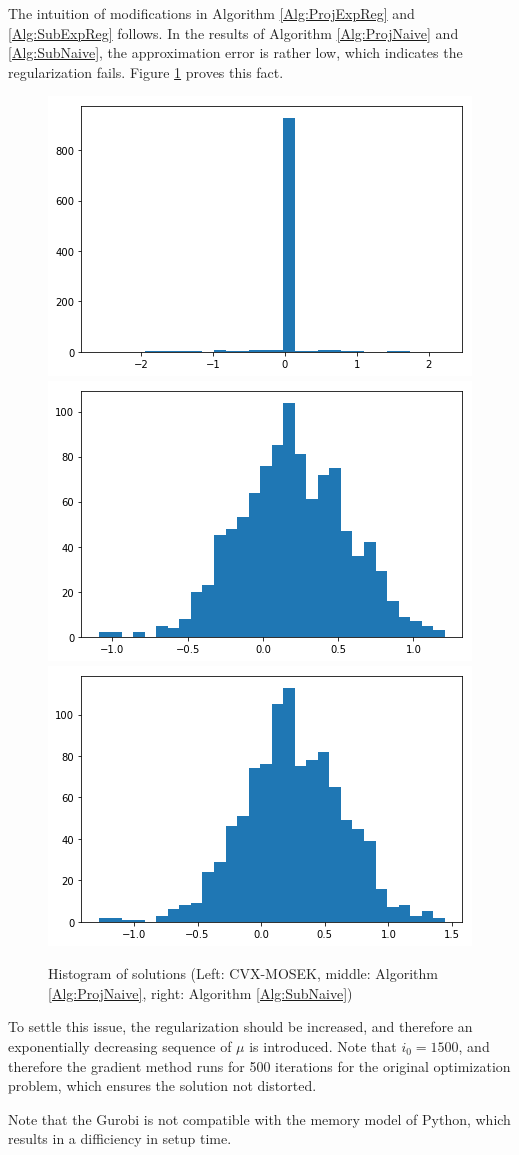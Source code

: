 \documentclass[english]{pkupaper}
\begin{document}
The intuition of modifications in Algorithm \ref{Alg:ProjExpReg} and \ref{Alg:SubExpReg} follows. In the results of Algorithm \ref{Alg:ProjNaive} and \ref{Alg:SubNaive}, the approximation error is rather low, which indicates the regularization fails. Figure \ref{Fig:SparseHist} proves this fact.
\begin{figure}[htbp]
\centering
\includegraphics[width=0.24\pagewidth]{Figure01.png}
\includegraphics[width=0.24\pagewidth]{Figure02.png}
\includegraphics[width=0.24\pagewidth]{Figure03.png}
\caption{Histogram of solutions (Left: CVX-MOSEK, middle: Algorithm \ref{Alg:ProjNaive}, right: Algorithm \ref{Alg:SubNaive})} \label{Fig:SparseHist}
\end{figure}
To settle this issue, the regularization should be increased, and therefore an exponentially decreasing sequence of $\mu$ is introduced. Note that $ i_0 = 1500 $, and therefore the gradient method runs for 500 iterations for the original optimization problem, which ensures the solution not distorted.

Note that the Gurobi is not compatible with the memory model of Python, which results in a difficiency in setup time.

	
\end{document}
